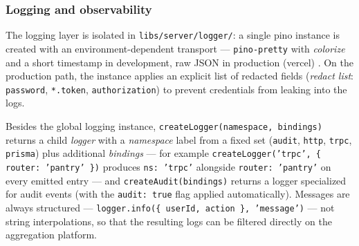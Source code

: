 \subsubsection{Logging and observability}\label{subsec:jurnalizare}

The \gls{logging} layer is isolated in \texttt{libs/server/logger/}: a single \gls{pino} instance is created with an environment-dependent transport --- \texttt{pino-pretty} with \textit{colorize} and a short timestamp in development, raw JSON in production (\gls{vercel}) \cite{pino}. On the production path, the instance applies an explicit list of redacted fields (\textit{redact list}: \texttt{password}, \texttt{*.token}, \texttt{authorization}) to prevent credentials from leaking into the logs.

Besides the global logging instance, \texttt{createLogger(namespace, bindings)} returns a child \textit{logger} with a \textit{namespace} label from a fixed set (\texttt{audit}, \texttt{http}, \texttt{trpc}, \texttt{prisma}) plus additional \textit{bindings} --- for example \texttt{createLogger('trpc', \{ router: 'pantry' \})} produces \texttt{ns: 'trpc'} alongside \texttt{router: 'pantry'} on every emitted entry --- and \texttt{createAudit(bindings)} returns a logger specialized for audit events (with the \texttt{audit: true} flag applied automatically). Messages are always structured --- \texttt{logger.info(\{ userId, action \}, 'message')} --- not string interpolations, so that the resulting logs can be filtered directly on the aggregation platform.

